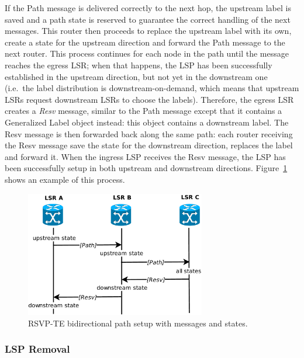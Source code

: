 \documentclass[10pt,a4paper]{report}
\begin{document}
If the Path message is delivered correctly to the next hop, the
upstream label is saved and a path state is reserved to guarantee the
correct handling of the next messages. This router then proceeds to
replace the upstream label with its own, create a state for the
upstream direction and forward the Path message to the next
router. This process continues for each node in the path until the
message reaches the egress LSR; when that happens, the LSP has been
successfully established in the upstream direction, but not yet in the
downstream one (i.e.\ the label distribution is downstream-on-demand,
which means that upstream LSRs request downstream LSRs to choose the
labels). Therefore, the egress LSR creates a \textit{Resv} message,
similar to the Path message except that it contains a Generalized
Label object instead: this object contains a downstream label. The
Resv message is then forwarded back along the same path: each router
receiving the Resv message save the state for the downstream
direction, replaces the label and forward it. When the ingress LSP
receives the Resv message, the LSP has been successfully setup in both
upstream and downstream directions. Figure~\ref{fig:rsvp_path} shows
an example of this process.

\begin{figure}[!htbp]
  \centering
  \includegraphics[width=0.7\textwidth]{img/rsvp_path}
  \caption[RSVP-TE path setup]{RSVP-TE bidirectional path setup with
    messages and states.}
  \label{fig:rsvp_path}
\end{figure}

\subsubsection{LSP Removal}
\end{document}
